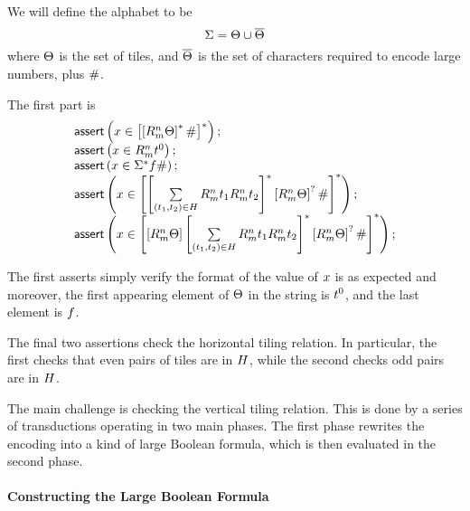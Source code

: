 We will define the alphabet to be
\[
    \Sigma = \Theta \cup \overline{\Theta}
\]
where $\Theta$ is the set of tiles, and $\overline{\Theta}$ is the set of characters required to encode large numbers, plus $\#$.

The first part is
\[
    \begin{array}{l}
        \textsf{assert}\left(x \in
            \left[
                \left[
                    R^{n}_{m} \Theta
                \right]^\ast
                \#
            \right]^\ast
        \right); \\
        \textsf{assert}\left(x \in R^{n}_{m} t^0\right); \\
        \textsf{assert}\left(x \in \Sigma^\ast f \#\right); \\
        \textsf{assert}\left(x \in
            \left[
                \left[
                    \sum\limits_{\left( t_1, t_2 \right) \in H}
                        R^{n}_{m} t_1
                        R^{n}_{m} t_2
                \right]^\ast
                \left[R^{n}_{m} \Theta\right]^?
                \#
            \right]^\ast
        \right); \\
        \textsf{assert}\left(x \in
            \left[
                \left[R^{n}_{m} \Theta\right]
                \left[
                    \sum\limits_{\left( t_1, t_2 \right) \in H}
                        R^{n}_{m} t_1
                        R^{n}_{m} t_2
                \right]^\ast
                \left[R^{n}_{m} \Theta\right]^?
                \#
            \right]^\ast
        \right); \\
    \end{array}
\]

The first asserts simply verify the format of the value of $x$ is as
expected and moreover, the first appearing element of $\Theta$ in the string is
$t^0$, and the last element is $f$.

The final two assertions check the horizontal tiling relation.  In particular,
the first checks that even pairs of tiles are in $H$, while the second
checks odd pairs are in $H$.


The main challenge is checking the vertical tiling relation. This is
done by a series of transductions operating in two main phases. The
first phase rewrites the encoding into a kind of large Boolean formula,
which is then evaluated in the second phase.

\paragraph{Constructing the Large Boolean Formula}

